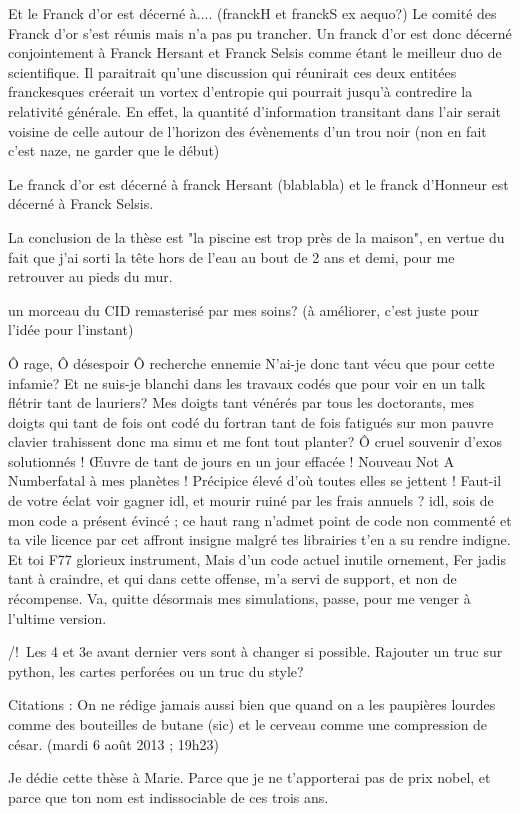 Et le Franck d'or est décerné à.... (franckH et franckS ex aequo?)
Le comité des Franck d'or s'est réunis mais n'a pas pu trancher. Un franck d'or est donc décerné conjointement à Franck Hersant et Franck Selsis comme étant le meilleur duo de scientifique. Il paraitrait qu'une discussion qui réunirait ces deux entitées franckesques créerait un vortex d'entropie qui pourrait jusqu'à contredire la relativité générale. En effet, la quantité d'information transitant dans l'air serait voisine de celle autour de l'horizon des évènements d'un trou noir (non en fait c'est naze, ne garder que le début)

Le franck d'or est décerné à franck Hersant (blablabla) et le franck d'Honneur est décerné à Franck Selsis.

La conclusion de la thèse est "la piscine est trop près de la maison", en vertue du fait que j'ai sorti la tête hors de l'eau au bout de 2 ans et demi, pour me retrouver au pieds du mur.

un morceau du CID remasterisé par mes soins? (à améliorer, c'est juste pour l'idée pour l'instant)


Ô rage, Ô désespoir Ô recherche ennemie
N'ai-je donc tant vécu que pour cette infamie?
Et ne suis-je blanchi dans les travaux codés
que pour voir en un talk flétrir tant de lauriers? 
Mes doigts tant vénérés par tous les doctorants, 
mes doigts qui tant de fois ont codé du fortran
tant de fois fatigués sur mon pauvre clavier
trahissent donc ma simu et me font tout planter? 
Ô cruel souvenir d'exos solutionnés !
Œuvre de tant de jours en un jour effacée !
Nouveau \og Not A Number\fg fatal à mes planètes !
Précipice élevé d'où toutes elles se jettent !
Faut-il de votre éclat voir gagner idl, 
et mourir ruiné par les frais annuels ? 
idl, sois de mon code a présent évincé ; 
ce haut rang n'admet point de code non commenté
et ta vile licence par cet affront insigne
malgré tes librairies t'en a su rendre indigne. 
Et toi F77 glorieux instrument, 
Mais d'un code actuel inutile ornement, 
Fer jadis tant à craindre, et qui dans cette offense, 
m'a servi de support, et non de récompense. 
Va, quitte désormais mes simulations,
passe, pour me venger à l'ultime version.

/!\ Les 4 et 3e avant dernier vers sont à changer si possible. Rajouter un truc sur python, les cartes perforées ou un truc du style?


Citations : 
On ne rédige jamais aussi bien que quand on a les paupières lourdes comme des bouteilles de butane (sic) et le cerveau comme une
compression de césar. (mardi 6 août 2013 ; 19h23)

Je dédie cette thèse à Marie. Parce que je ne t'apporterai pas de prix nobel, et parce que ton nom est indissociable de ces
trois ans.
